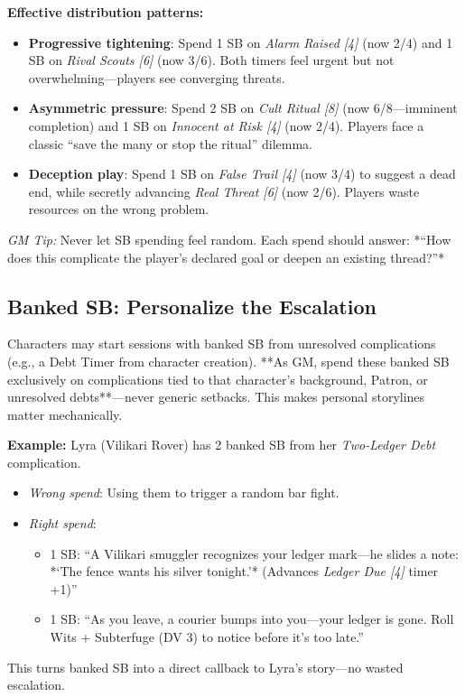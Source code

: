 \textbf{Effective distribution patterns:}
\begin{itemize}
  \item \textbf{Progressive tightening}: Spend 1 SB on \emph{Alarm Raised [4]} (now 2/4) and 1 SB on \emph{Rival Scouts [6]} (now 3/6). Both timers feel urgent but not overwhelming---players see converging threats.
  \item \textbf{Asymmetric pressure}: Spend 2 SB on \emph{Cult Ritual [8]} (now 6/8---imminent completion) and 1 SB on \emph{Innocent at Risk [4]} (now 2/4). Players face a classic ``save the many or stop the ritual'' dilemma.
  \item \textbf{Deception play}: Spend 1 SB on \emph{False Trail [4]} (now 3/4) to suggest a dead end, while secretly advancing \emph{Real Threat [6]} (now 2/6). Players waste resources on the wrong problem.
\end{itemize}
\textit{GM Tip:} Never let SB spending feel random. Each spend should answer: *``How does this complicate the player's declared goal or deepen an existing thread?''* 

\subsection*{Banked SB: Personalize the Escalation}
Characters may start sessions with banked SB from unresolved complications (e.g., a Debt Timer from character creation). **As GM, spend these banked SB exclusively on complications tied to that character's background, Patron, or unresolved debts**---never generic setbacks. This makes personal storylines matter mechanically.

\textbf{Example:} Lyra (Vilikari Rover) has 2 banked SB from her \textit{Two-Ledger Debt} complication. 
\begin{itemize}
  \item \textit{Wrong spend}: Using them to trigger a random bar fight. 
  \item \textit{Right spend}: 
    \begin{itemize}
      \item 1 SB: ``A Vilikari smuggler recognizes your ledger mark---he slides a note: *`The fence wants his silver tonight.'* (Advances \textit{Ledger Due [4]} timer +1)'' 
      \item 1 SB: ``As you leave, a courier bumps into you---your ledger is gone. Roll Wits + Subterfuge (DV 3) to notice before it's too late.'' 
    \end{itemize}
\end{itemize}
This turns banked SB into a direct callback to Lyra's story---no wasted escalation.

